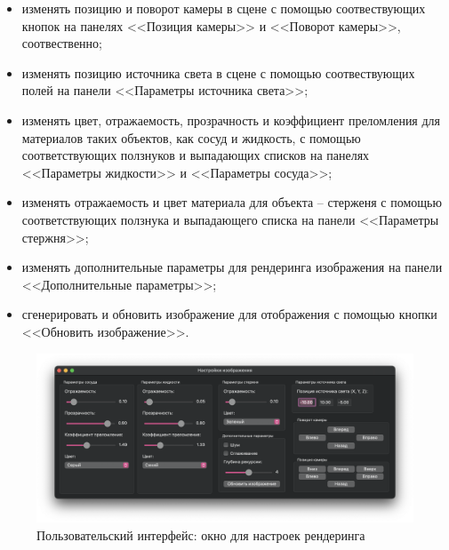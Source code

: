 	\begin{itemize}
	\item изменять позицию и поворот камеры в сцене с помощью соотвествующих кнопок на панелях <<Позиция камеры>> и <<Поворот камеры>>, соотвественно;
	\item изменять позицию источника света в сцене с помощью соотвествующих полей на панели <<Параметры источника света>>;
	\item изменять цвет, отражаемость, прозрачность и коэффициент преломления для материалов таких объектов, как сосуд и жидкость, с помощью соответствующих ползнуков и выпадающих списков на панелях <<Параметры жидкости>> и <<Параметры сосуда>>;
	\item изменять отражаемость и цвет материала для объекта -- стерженя с помощью соответствующих ползнука и выпадающего списка на панели <<Параметры стержня>>;
	\item изменять дополнительные параметры для рендеринга изображения на панели <<Дополнительные параметры>>;
	\item сгенерировать и обновить изображение для отображения с помощью кнопки <<Обновить изображение>>.
\end{itemize}

\begin{figure}[ht!]
	\begin{center}
		\includegraphics[scale=0.43]{img/ui-settings.png}
	\end{center}
	\caption{Пользовательский интерфейс: окно для настроек рендеринга}
	\label{ui-set}
\end{figure}

